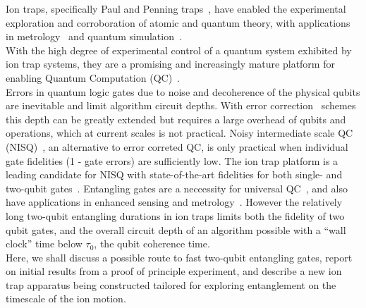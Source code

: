 \documentclass[12pt]{iopart}
\begin{document}
Ion traps, specifically Paul and Penning traps~\cite{paul_electromagnetic_1990, wineland_experimental_1998}, have enabled the
experimental exploration and corroboration of atomic and quantum
theory, with applications in metrology~\cite{ludlow_optical_2015} and quantum simulation~\cite{blatt_quantum_2012}. \\ With the high
degree of experimental control of a quantum system exhibited by ion
trap systems, they are a promising and increasingly mature platform
for enabling Quantum Computation (QC)~\cite{ozeri_tutorial_2011}.\\ Errors in quantum logic gates
due to noise and decoherence of the physical qubits are inevitable and
limit algorithm circuit depths. With error correction~\cite{steane_overhead_2003} schemes
this depth can be greatly extended but requires a large overhead of qubits
and operations, which at current scales is not practical.
Noisy intermediate scale QC (NISQ)~\cite{preskill_quantum_2018}, an alternative to error
correted QC, is only practical when individual gate fidelities (1 -
gate errors) are sufficiently low.  The ion trap platform is a leading
candidate for NISQ with state-of-the-art fidelities
for both single- and two-qubit gates~\cite{srinivas_high_2021, ballance_high_2016, harty_high_2014}.  Entangling gates
are a neccessity for universal QC~\cite{divincenzo_physical_2000, blatt_entangled_2008}, and also have applications in
enhanced sensing and metrology~\cite{ono_entanglement_2013, nichols_elementary_2022}.  However
the relatively long two-qubit entangling durations in ion traps limits
both the fidelity of two qubit gates, and the overall circuit
depth of an algorithm possible with a ``wall clock'' time below
$\tau_0$, the qubit coherence time.\\
Here, we shall discuss a possible route to fast two-qubit entangling
gates, report on initial results from a proof of principle experiment,
and describe a new ion trap apparatus being constructed tailored for
exploring entanglement on the timescale of the ion motion.\\
\end{document}
